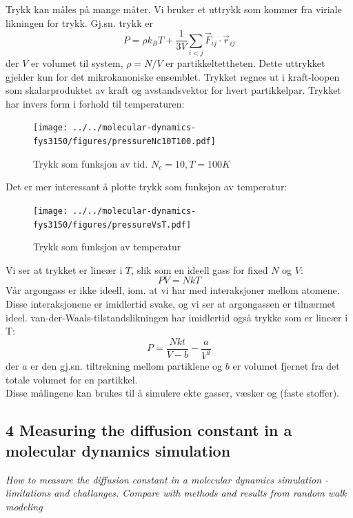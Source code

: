 \documentclass[english, a4paper]{article}
\begin{document}
\noindent
Trykk kan måles på mange måter. Vi bruker et uttrykk som kommer fra viriale likningen for trykk. 
Gj.sn. trykk er
\begin{equation}
 P = \rho k_BT + \frac{1}{3V} \sum_{i<j} \vec{F}_{ij} \cdot \vec{r}_{ij}
\end{equation}
der $V$ er volumet til system, $\rho = N/V$ er partikkeltettheten. Dette uttrykket 
gjelder kun for det mikrokanoniske ensemblet. Trykket regnes ut i kraft-loopen som skalarproduktet
av kraft og avstandsvektor for hvert partikkelpar. 
Trykket har invers form i forhold til temperaturen:
\begin{figure}[H]
  \begin{center}
  \texttt{[image: ../../molecular-dynamics-fys3150/figures/pressureNc10T100.pdf]}
  \caption{Trykk som funksjon av tid. $N_c = 10, T = 100 K$}
  \label{fig:fig3}
  \end{center}
\end{figure}
Det er mer interessant å plotte trykk som funksjon av temperatur:
\begin{figure}[H]
  \begin{center}
  \texttt{[image: ../../molecular-dynamics-fys3150/figures/pressureVsT.pdf]}
  \caption{Trykk som funksjon av temperatur}
  \label{fig:fig4}
  \end{center}
\end{figure}
Vi ser at trykket er lineær i $T$, slik som en ideell gass for fixed $N$ og $V$:
\begin{equation}
 PV = NkT
\end{equation}
Vår argongass er ikke ideell, iom. at vi har med interaksjoner mellom atomene. Disse
interaksjonene er imidlertid svake, og vi ser at argongassen er tilnærmet ideel.
van-der-Waals-tilstandslikningen har imidlertid også trykke som er lineær i T:
\begin{equation}
 P = \frac{Nkt}{V-b} - \frac{a}{V^2}
\end{equation}
der $a$ er den gj.sn. tiltrekning mellom partiklene og $b$ er volumet fjernet fra det totale volumet for en partikkel.\\

\noindent
Disse målingene kan brukes til å simulere ekte gasser, væsker og (faste stoffer). 


\subsection{4 Measuring the diffusion constant in a molecular dynamics simulation}
\textit{How to measure the diffusion constant in a molecular dynamics simulation - limitations
and challanges. Compare with methods and results from random walk modeling}\\
\end{document}
